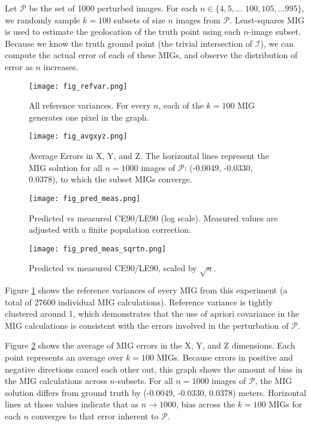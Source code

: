\documentclass[10pt]{amsart}
\newcommand{\Iimg}{\mathcal{I}}
\newcommand{\Pimg}{\mathcal{P}}
\begin{document}
Let $\Pimg$ be the set of 1000 perturbed images. For each
$n\in\{4,5,...$ $100,105,...995\}$, we randomly sample $k=100$ subsets of size
$n$ images from $\Pimg$. Least-squares MIG is used to estimate the geolocation
of the truth point using each $n$-image subset. Because we know the truth ground
point (the trivial intersection of $\Iimg$), we can compute the actual error of
each of these MIGs, and observe the distribution of error as $n$ increases.

\begin{figure}
\texttt{[image: fig\_refvar.png]}
\caption{\label{fig:vanillaref}All reference variances. For every $n$, each of
  the $k=100$ MIG generates one pixel in the graph.}
\end{figure}

\begin{figure}
\texttt{[image: fig\_avgxyz.png]}
\caption{\label{fig:vanillaxyz}Average Errors in X, Y, and Z. The horizontal
  lines represent the MIG solution for all $n=1000$ images of $\Pimg$: (-0.0049,
  -0.0330, 0.0378), to which the subset MIGs converge.}
\end{figure}

\begin{figure}
\texttt{[image: fig\_pred\_meas.png]}
\caption{\label{fig:vanilla_pred_meas}Predicted vs measured CE90/LE90 (log
  scale). Measured values are adjusted with a finite population correction.}
\end{figure}

\begin{figure}
\texttt{[image: fig\_pred\_meas\_sqrtn.png]}
\caption{\label{fig:vanilla_pred_meas_sqrtn}Predicted vs measured CE90/LE90,
  scaled by $\sqrt{n}$.}
\end{figure}

Figure \ref{fig:vanillaref} shows the reference variances of every MIG from this
experiment (a total of 27600 individual MIG calculations). Reference variance is
tightly clustered around 1, which demonstrates that the use of apriori
covariance in the MIG calculations is consistent with the errors involved in the
perturbation of $\Pimg$.

Figure \ref{fig:vanillaxyz} shows the average of MIG errors in the X, Y, and Z
dimensions. Each point represents an average over $k=100$ MIGs. Because errors
in positive and negative directions cancel each other out, this graph shows the
amount of bias in the MIG calculations across $n$-subsets. For all $n=1000$
images of $\Pimg$, the MIG solution differs from ground truth by (-0.0049,
-0.0330, 0.0378) meters. Horizontal lines at those values indicate that as
$n\rightarrow 1000$, bias across the $k=100$ MIGs for each $n$ converges to that
error inherent to $\Pimg$.
\end{document}
